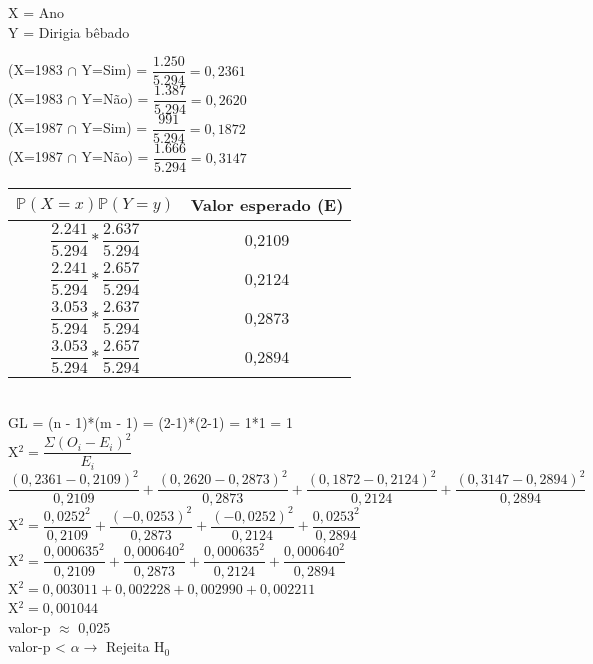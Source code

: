 \documentclass[12pt,a4paper]{article}
\begin{document}
	X = Ano\\
	Y = Dirigia bêbado\\
	\begin{center}
		\vspace{0.5cm}
		(X=1983 $\cap$ Y=Sim) = $\dfrac{1.250}{5.294} = 0,2361$
		\vspace{0.5cm}\\
		(X=1983 $\cap$ Y=Não) = $\dfrac{1.387}{5.294} = 0,2620$
		\vspace{0.5cm}\\
		(X=1987 $\cap$ Y=Sim) = $\dfrac{991}{5.294} = 0,1872$
		\vspace{0.5cm}\\
		(X=1987 $\cap$ Y=Não) = $\dfrac{1.666}{5.294} = 0,3147$
		\vspace{0.75cm}\\
		\begin{tabular}{|c|c|}\hline
			$\mathbb{P}(X=x)\mathbb{P}(Y=y)$ & Valor esperado (E)\\ \hline
			$\dfrac{2.241}{5.294}*\dfrac{2.637}{5.294}$ & 0,2109\\ \hline
			$\dfrac{2.241}{5.294}*\dfrac{2.657}{5.294}$ & 0,2124\\ \hline
			$\dfrac{3.053}{5.294}*\dfrac{2.637}{5.294}$ & 0,2873\\ \hline
			$\dfrac{3.053}{5.294}*\dfrac{2.657}{5.294}$ & 0,2894\\ \hline
		\end{tabular}
	\vspace{0.5cm}\\
	GL = (n - 1)*(m - 1) = (2-1)*(2-1) = 1*1 = 1
	\vspace{0.75cm}\\
	X$^{2} = \dfrac{\Sigma(O_{i}-E_{i})^2}{E_{i}}$
	\vspace{0.25cm}\\
	$\dfrac{(0,2361 - 0,2109)^2}{0,2109} + \dfrac{(0,2620 - 0,2873)^2}{0,2873} + \dfrac{(0,1872 - 0,2124)^2}{0,2124} + \dfrac{(0,3147 - 0,2894)^2}{0,2894}$
	\vspace{0.25cm}\\
	X$^{2} = \dfrac{0,0252^2}{0,2109} + \dfrac{(-0,0253)^2}{0,2873} + \dfrac{(-0,0252)^2}{0,2124} + \dfrac{0,0253^2}{0,2894}$
	\vspace{0.25cm}\\
	X$^{2} = \dfrac{0,000635^2}{0,2109} + \dfrac{0,000640^2}{0,2873} + \dfrac{0,000635^2}{0,2124} + \dfrac{0,000640^2}{0,2894}$
	\vspace{0.25cm}\\
	X$^{2} = 0,003011 + 0,002228 + 0,002990 + 0,002211$
	\vspace{0.25cm}\\
	X$^{2} = 0,001044$
	\vspace{0.75cm}\\
	valor-p $\approx$ 0,025
	\vspace{0.5cm}\\
	valor-p  < $\alpha \rightarrow$ Rejeita H$_{0}$ 
	\end{center}
\end{document}
